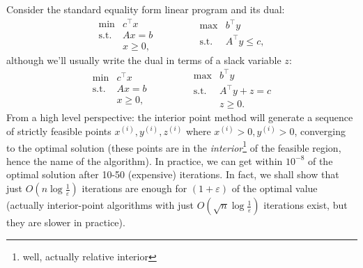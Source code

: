 \documentclass[11pt]{article}
\numberwithin{equation}{section}
\theoremstyle{definition}
\newcommand{\tst}{\text{s.t.}}
\begin{document}
Consider the standard equality form linear program and its dual:
\begin{equation}
    \begin{array}{cc}
         \min & c^\top x  \\
         \tst & Ax=b\\
              & x\ge 0,
    \end{array}\qquad\qquad
    \begin{array}{cc}
         \max & b^\top y  \\
         \tst & A^\top y\le c,\\
    \end{array}
\end{equation}
although we'll usually write the dual in terms of a slack variable $z$:
\begin{equation}
    \begin{array}{cc}
         \min & c^\top x  \\
         \tst & Ax=b\\
              & x\ge 0,
    \end{array}\qquad\qquad
    \begin{array}{cc}
         \max & b^\top y  \\
         \tst & A^\top y+z= c\\
              & z\ge 0.
    \end{array}
\end{equation}
From a high level perspective: the interior point method will generate a sequence of strictly feasible points $x^{(i)}, y^{(i)}, z^{(i)}$ where $x^{(i)}>0, y^{(i)}>0$, converging to the optimal solution (these points are in the \textit{interior}\footnote{well, actually relative interior} of the feasible region, hence the name of the algorithm). In practice, we can get within $10^{-8}$ of the optimal solution after 10-50 (expensive) iterations. In fact, we shall show that just $O( n\log{\frac1\varepsilon})$ iterations are enough for $(1+\varepsilon)$ of the optimal value (actually interior-point algorithms with just $O(\sqrt{n}\log{\frac1\varepsilon})$ iterations exist, but they are slower in practice).
\end{document}
